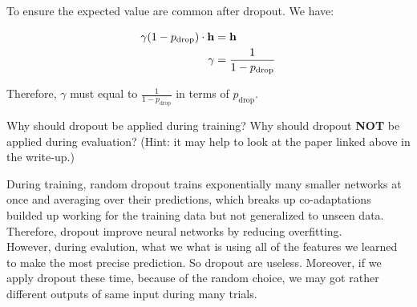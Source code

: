 \begin{parts}
\begin{subparts}
\begin{mdframed}[backgroundcolor=gray!10]
\begin{answer}
                    To ensure the expected value are common after dropout. We have:

                    \begin{align*}
                        \gamma (1 - p_{\text{drop}}) \cdot \mathbf{h} & = \mathbf{h} \\
                        \gamma & = \frac{1}{1 - p_{\text{drop}}}
                    \end{align*}

                    Therefore, $\gamma$ must equal to $\frac{1}{1 - p_{\text{drop}}}$ in terms of $p_{\text{drop}}$.
                \end{answer} \end{mdframed}
            \subpart[2] Why should dropout be applied during training? Why should dropout \textbf{NOT} be applied during evaluation? (Hint: it may help to look at the paper linked above in the write-up.) 
                \begin{mdframed}[backgroundcolor=gray!10]\begin{answer}
                    During training, random dropout trains exponentially many smaller networks at once and averaging over their predictions, which breaks up co-adaptations builded up working for the training data but not generalized to unseen data. Therefore, dropout improve neural networks by reducing overfitting. \\
                    However, during evalution, what we what is using all of the features we learned to make the most precise prediction. So dropout are useless. Moreover, if we apply dropout these time, because of the random choice, we may got rather different outputs of same input during many trials.
                \end{answer} \end{mdframed}
        \end{subparts}


\end{parts}
